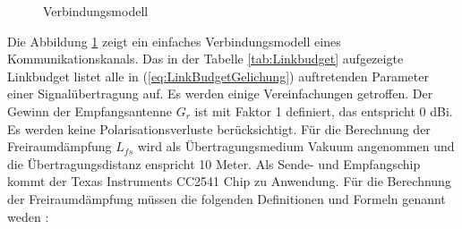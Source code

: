 \begin{figure}[!ht]
\begin{center}
\end{center}
\caption{Verbindungsmodell}
\label{fig:LinkModell}
\end{figure}

Die Abbildung \ref{fig:LinkModell} zeigt ein einfaches Verbindungsmodell eines Kommunikationskanals. Das in der Tabelle \ref{tab:Linkbudget} aufgezeigte Linkbudget listet alle in (\ref{eq:LinkBudgetGelichung}) auftretenden Parameter  einer Signalübertragung auf. Es werden einige Vereinfachungen getroffen. Der Gewinn der Empfangsantenne $G_{r}$  ist mit Faktor 1 definiert, das entspricht 0 dBi. Es werden keine Polarisationsverluste berücksichtigt. Für die Berechnung der Freiraumdämpfung $L_{fs}$ wird als Übertragungsmedium Vakuum angenommen und die Übertragungsdistanz enspricht 10 Meter. Als Sende- und Empfangschip kommt der Texas Instruments CC2541 Chip zu Anwendung. Für die Berechnung der Freiraumdämpfung müssen die folgenden Definitionen und Formeln genannt weden \cite{Tekom}:
 
